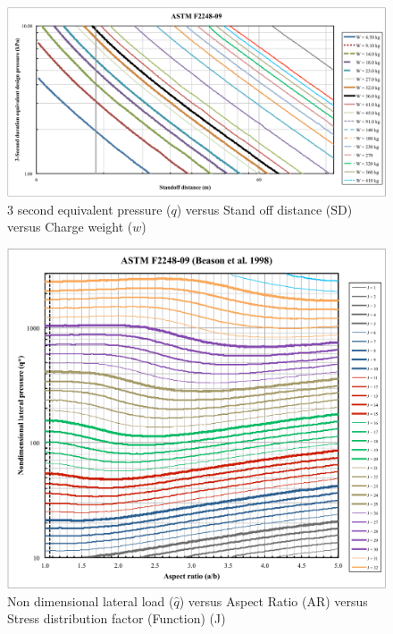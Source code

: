 \documentclass[12pt]{article}
\begin{document}
\begin{figure}[h!]
 \begin{center}
 \includegraphics[scale=0.5]{ASTM_F2248-09.pdf}
 \caption{3 second equivalent pressure ($q$) versus Stand off distance ($\text{SD}$) versus
   Charge weight ($w$)}
\label{Fig_ASTM_F2248-09}
 \end{center}
 \end{figure}

 \begin{figure}[h!]
 \begin{center}
 \includegraphics[scale=0.7]{ASTM_F2248-09_BeasonEtAl.pdf}
 \caption{Non dimensional lateral load ($\hat{q}$) versus Aspect Ratio (AR) versus
   Stress distribution factor (Function) (J)}
\label{ASTM_F2248-09_BeasonEtAl}
 \end{center}
 \end{figure}
\end{document}
